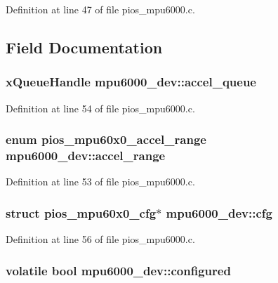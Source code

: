 \-Definition at line 47 of file pios\-\_\-mpu6000.\-c.



\subsection{\-Field \-Documentation}
\hypertarget{structmpu6000__dev_aab5a85c354860f95eabe5fdaac73504a}{
\subsubsection[{accel\-\_\-queue}]{\setlength{\rightskip}{0pt plus 5cm}x\-Queue\-Handle {\bf mpu6000\-\_\-dev\-::accel\-\_\-queue}}}\label{structmpu6000__dev_aab5a85c354860f95eabe5fdaac73504a}


\-Definition at line 54 of file pios\-\_\-mpu6000.\-c.

\hypertarget{structmpu6000__dev_a97c53e87c85ad8b04916492833bedadb}{
\subsubsection[{accel\-\_\-range}]{\setlength{\rightskip}{0pt plus 5cm}enum {\bf pios\-\_\-mpu60x0\-\_\-accel\-\_\-range} {\bf mpu6000\-\_\-dev\-::accel\-\_\-range}}}\label{structmpu6000__dev_a97c53e87c85ad8b04916492833bedadb}


\-Definition at line 53 of file pios\-\_\-mpu6000.\-c.

\hypertarget{structmpu6000__dev_a4a8e8aa9b09f9ce6dcb417ff154282bc}{
\subsubsection[{cfg}]{\setlength{\rightskip}{0pt plus 5cm}struct {\bf pios\-\_\-mpu60x0\-\_\-cfg}$\ast$ {\bf mpu6000\-\_\-dev\-::cfg}}}\label{structmpu6000__dev_a4a8e8aa9b09f9ce6dcb417ff154282bc}


\-Definition at line 56 of file pios\-\_\-mpu6000.\-c.

\hypertarget{structmpu6000__dev_a235cf7e1cc85cf6707100027c483894a}{
\subsubsection[{configured}]{\setlength{\rightskip}{0pt plus 5cm}volatile bool {\bf mpu6000\-\_\-dev\-::configured}}}\label{structmpu6000__dev_a235cf7e1cc85cf6707100027c483894a}


